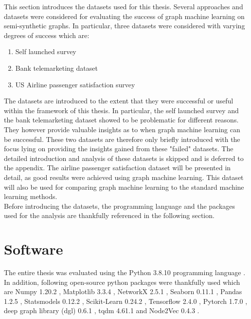   
  This section introduces the datasets used for this thesis. Several approaches
  and datasets were considered for evaluating the success of graph machine
  learning on semi-synthetic graphs. In particular, three datasets were 
  considered with varying degrees of success which are:

  \begin{enumerate}
    \item Self launched survey
    \item Bank telemarketing dataset
    \item US Airline passenger satisfaction survey
  \end{enumerate}

  \noindent The datasets are introduced to the extent that they were successful 
  or useful within the framework of this thesis. In particular, the self 
  launched survey and the bank telemarketing dataset showed to be problematic 
  for different reasons. They however provide valuable insights as
  to when graph machine learning can be successful. These two datasets are 
  therefore only briefly introduced with the focus lying on providing the
  insights gained from these "failed" datasets. The detailed introduction and
  analysis of these datasets is skipped and is deferred to the appendix. The
  airline passenger satisfaction dataset will be presented in detail, as good
  results were achieved using graph machine learning. This dataset will also be
  used for comparing graph machine learning to the standard machine learning
  methods. \\

  \noindent Before introducing the datasets, the programming language and the
   packages used for the analysis are thankfully referenced in the following 
   section.

  \section{Software}

  The entire thesis was evaluated using the Python 3.8.10 programming
  language \citep{vanRossum2009}. In addition, following open-source python
  packages were thankfully used which are Numpy 1.20.2 \citep{harris2020array},
  Matplotlib 3.3.4 \citep{Hunter2007}, NetworkX 2.5.1 \citep{hagberg2008exploring}, 
  Seaborn 0.11.1 \citep{Waskom2021}, Pandas 1.2.5 \citep{mckinney2010data}, 
  Statsmodels 0.12.2 \citep{seabold2010statsmodels}, Scikit-Learn 0.24.2 
  \citep{pedregosa2011scikit}, Tensorflow 2.4.0 \citep{abadi2016tensorflow}, 
  Pytorch 1.7.0 \citep{paszke2019pytorch}, deep graph library (dgl) 0.6.1 
  \citep{wang2019deep}, tqdm 4.61.1 \citep{da2021tqdm} and Node2Vec 0.4.3 
  \citep{Cohen2021}. 

